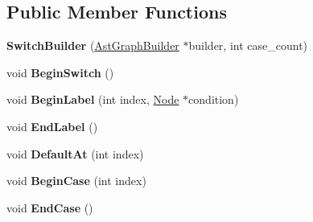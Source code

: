 \subsection*{Public Member Functions}
\begin{DoxyCompactItemize}
\item 
{\bfseries Switch\+Builder} (\hyperlink{classv8_1_1internal_1_1compiler_1_1_ast_graph_builder}{Ast\+Graph\+Builder} $\ast$builder, int case\+\_\+count)\hypertarget{classv8_1_1internal_1_1compiler_1_1_switch_builder_a32c9d0c20e3c4a4af7543ed16e8489d2}{}\label{classv8_1_1internal_1_1compiler_1_1_switch_builder_a32c9d0c20e3c4a4af7543ed16e8489d2}

\item 
void {\bfseries Begin\+Switch} ()\hypertarget{classv8_1_1internal_1_1compiler_1_1_switch_builder_a638df966a46ea4b4f7d64cd3f6d2933a}{}\label{classv8_1_1internal_1_1compiler_1_1_switch_builder_a638df966a46ea4b4f7d64cd3f6d2933a}

\item 
void {\bfseries Begin\+Label} (int index, \hyperlink{classv8_1_1internal_1_1compiler_1_1_node}{Node} $\ast$condition)\hypertarget{classv8_1_1internal_1_1compiler_1_1_switch_builder_ab8acf4e9fe3c320fcbee8df2ad8c1078}{}\label{classv8_1_1internal_1_1compiler_1_1_switch_builder_ab8acf4e9fe3c320fcbee8df2ad8c1078}

\item 
void {\bfseries End\+Label} ()\hypertarget{classv8_1_1internal_1_1compiler_1_1_switch_builder_a9986ca9128d4f48ca3c260fa98c9c10d}{}\label{classv8_1_1internal_1_1compiler_1_1_switch_builder_a9986ca9128d4f48ca3c260fa98c9c10d}

\item 
void {\bfseries Default\+At} (int index)\hypertarget{classv8_1_1internal_1_1compiler_1_1_switch_builder_a9ef4f705894d001528a4282837137835}{}\label{classv8_1_1internal_1_1compiler_1_1_switch_builder_a9ef4f705894d001528a4282837137835}

\item 
void {\bfseries Begin\+Case} (int index)\hypertarget{classv8_1_1internal_1_1compiler_1_1_switch_builder_a2e3ddb15c973b98b93f7a202345f1488}{}\label{classv8_1_1internal_1_1compiler_1_1_switch_builder_a2e3ddb15c973b98b93f7a202345f1488}

\item 
void {\bfseries End\+Case} ()\hypertarget{classv8_1_1internal_1_1compiler_1_1_switch_builder_a785756979b91227dacf18ada4a1375ab}{}\label{classv8_1_1internal_1_1compiler_1_1_switch_builder_a785756979b91227dacf18ada4a1375ab}


\end{DoxyCompactItemize}
